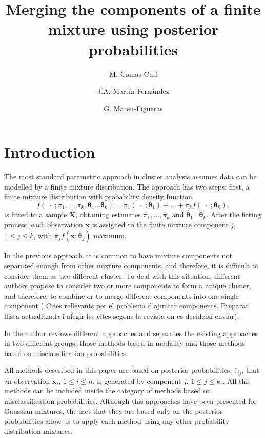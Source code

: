 \documentclass[10pt, a4paper]{article}
\title{Merging the components of a finite mixture using  posterior probabilities}
\author{M. Comas-Cufí \and J.A. Martín-Fernández \and G. Mateu-Figueras}
\newcommand{\m}[1]{\boldsymbol{#1}}
\begin{document}
\maketitle

\section{Introduction}

The most standard parametric approach in cluster analysis assumes data can be modelled by a finite mixture distribution. The approach has two steps; first, a finite mixture distribution with probability density function
\[
f(\;\cdot\; ; \pi_1, \dots, \pi_k, \m\theta_1 \dots \m\theta_k) = \pi_1   (\;\cdot\; ; \m\theta_1) + \dots + \pi_k f(\;\cdot\; ; \m\theta_k),
\]%
is fitted to a sample $\m X$, obtaining estimates $\hat{\pi}_1, \dots, \hat{\pi}_k$ and $\hat{\m\theta}_1 \dots \hat{\m\theta}_k$. After the fitting process, each observation $\m x$ is assigned to the finite mixture component $j$, $1\leq j \leq k$, with $\hat{\pi}_j f(\m x ; \hat{\m\theta}_j)$ maximum. 

In the previous approach, it is common to have mixture components not separated enough from other mixture components, and therefore, it is difficult to consider them as two different cluster. To deal with this situation, different authors propose to consider two or more components to form a unique cluster, and therefore, to combine or to merge different components into one single component ({\color{red} Cites rellevants per el problema d'ajuntar components. Preparar llista actualitzada i afegir les cites segons la revista on es decideixi enviar}).

In \cite{hennig2010methods} the author reviews different approaches and separates the existing approaches in two different groups: those methods based in modality and those methods based on misclassification probabilities.

All methods described in this paper are based on posterior probabilities, $\hat{\tau}_{ij}$, that an observation $\m x_i$, $1\leq i \leq n$, is generated by component $j$, $1\leq j\leq k$ \citep{longford2014,melnykov2013distribution,hennig2010methods,baudry2010combining}. All this methods can be included inside the category of methods based on misclassification probabilities. Although this approaches have been presented for Gaussian mixtures, the fact that they are based only on the posterior probabilities allow us to apply each method using any other probability distribution mixtures.
\end{document}
